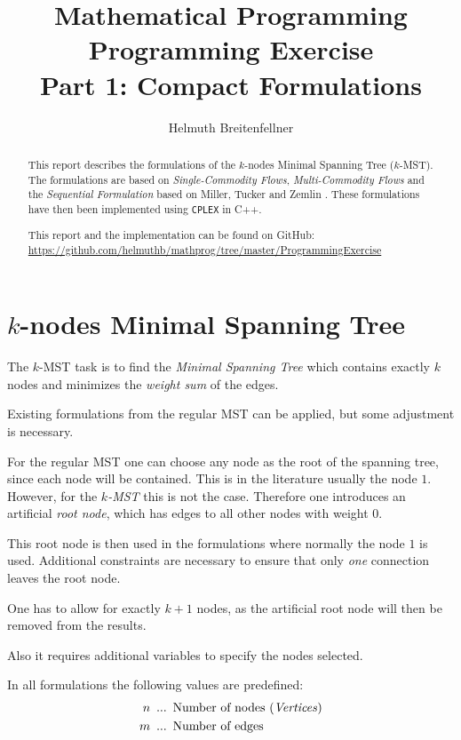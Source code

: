 \documentclass[11pt, oneside, a4paper, fleqn]{article}
\author{Helmuth Breitenfellner}
\title{Mathematical Programming\\
       Programming Exercise\\
       Part 1: Compact Formulations}
\date{}
\begin{document}
\maketitle
\begin{abstract}
This report describes the formulations of the $k$-nodes
Minimal Spanning Tree ($k$-MST).
The formulations are based on \textit{Single-Commodity Flows},
\textit{Multi-Commodity Flows} and the \textit{Sequential Formulation}
based on Miller, Tucker and Zemlin \cite{mtz1960}.
These formulations have then been implemented using \texttt{CPLEX}
in C++.

This report and the implementation can be found on GitHub:\\
\url{https://github.com/helmuthb/mathprog/tree/master/ProgrammingExercise}

\end{abstract}
\section*{$k$-nodes Minimal Spanning Tree}

The $k$-MST task is to find the \emph{Minimal Spanning Tree} which
contains exactly $k$ nodes and minimizes the \emph{weight sum}
of the edges.

Existing formulations from the regular MST can be applied, but
some adjustment is necessary.

For the regular MST one can choose any node as the root of
the spanning tree, since each node will be contained.
This is in the literature usually the node $1$.
However, for the \emph{$k$-MST} this is not the case.
Therefore one introduces an artificial \emph{root node},
which has edges to all other nodes with weight $0$.

This root node is then used in the formulations where normally the
node $1$ is used.
Additional constraints are necessary to ensure that only
\emph{one} connection leaves the root node.

One has to allow for exactly $k+1$ nodes, as the artificial root
node will then be removed from the results.

Also it requires additional variables to specify the nodes
selected.

In all formulations the following values are predefined:
\begin{align*}
  n & \enskip ... \enskip \text{Number of nodes (\emph{Vertices})} \\
  m & \enskip ... \enskip \text{Number of edges}
\end{align*}
\end{document}
